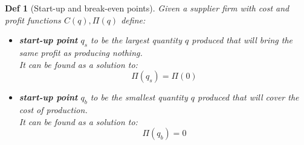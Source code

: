\documentclass[11pt,a4paper, margin]{article}
\theoremstyle{break}
\theoremstyle{break}
\newtheorem*{definition}{Def}
\begin{document}
\begin{definition} [Start-up and break-even points]

Given a supplier firm with cost and profit functions $C(q), \Pi(q)$ define:

\begin{itemize}
	\item \textbf{start-up point} $q_s$ to be the largest quantity $q$ produced that will bring the same profit as producing nothing. \\It can be found as a solution to:
\[\Pi(q_s) = \Pi(0)\]
	\item \textbf{start-up point} $q_b$ to be the smallest quantity $q$ produced that will cover the cost of production. \\It can be found as a solution to:
\[\Pi(q_b) = 0\]
\end{itemize} 

\end{definition}
\end{document}
